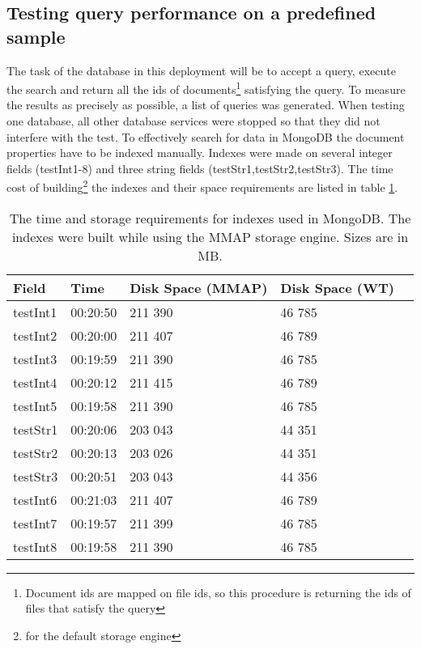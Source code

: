 \subsection{Testing query performance on a predefined sample}

The task of the database in this deployment will be to accept a query, execute the search and return all the 
ids of documents\footnote{Document ids are mapped on file ids, so this procedure is returning the ids of files
that satisfy the query} satisfying the query. To measure the results as precisely as possible, a list of
queries was generated. When testing one database, all other database services were stopped so that they did not
interfere with the test. To effectively search for data in MongoDB the document properties have to be 
indexed manually. Indexes were made on several integer fields (testInt1-8) and three string fields 
(testStr1,testStr2,testStr3). The time cost of building\footnote{for the default storage engine} the 
indexes and their space requirements are listed in table \ref{tab:indexBuildTimes}.

\begin{table}[h]
\centering
\begin{tabular}{|l|l|l|l|l|}
\hline
Field    & Time     & Disk Space (MMAP) & Disk Space (WT) \\ \hline
testInt1 & 00:20:50 & 211 390           & 46 785          \\ \hline
testInt2 & 00:20:00 & 211 407           & 46 789          \\ \hline
testInt3 & 00:19:59 & 211 390           & 46 785          \\ \hline
testInt4 & 00:20:12 & 211 415           & 46 789          \\ \hline
testInt5 & 00:19:58 & 211 390           & 46 785          \\ \hline
testStr1 & 00:20:06 & 203 043           & 44 351          \\ \hline
testStr2 & 00:20:13 & 203 026           & 44 351          \\ \hline
testStr3 & 00:20:51 & 203 043           & 44 356          \\ \hline
testInt6 & 00:21:03 & 211 407           & 46 789          \\ \hline
testInt7 & 00:19:57 & 211 399           & 46 785          \\ \hline
testInt8 & 00:19:58 & 211 390           & 46 785          \\ \hline
\end{tabular}
\caption{The time and storage requirements for indexes used in MongoDB. The indexes were built while using
the MMAP storage engine. Sizes are in MB.}
\label{tab:indexBuildTimes}
\end{table}

